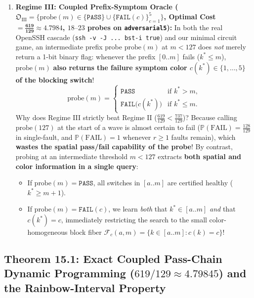 \documentclass[11pt,a4paper]{article}
\theoremstyle{definition}
\theoremstyle{remark}
\begin{document}
\begin{enumerate}[leftmargin=1.6em]
    \item \textbf{Regime III: Coupled Prefix-Symptom Oracle ($\mathfrak{O}_{\text{III}} = \{\text{probe}(m) \in \{\texttt{PASS}\} \cup \{\texttt{FAIL}(c)\}_{c=1}^5\}$, Optimal Cost $= \mathbf{\frac{619}{129} \approx 4.7984}$, $18\text{--}23$ probes on \texttt{adversarial5}):}
    In both the real OpenSSH cascade (\texttt{ssh -v -J ... bst-i true}) and our minimal circuit game, an intermediate prefix probe $\text{probe}(m)$ at $m < 127$ does \emph{not} merely return a 1-bit binary flag: whenever the prefix $[0..m]$ fails ($k^* \le m$), $\text{probe}(m)$ \textbf{also returns the failure symptom color $c(k^*) \in \{1,\dots,5\}$ of the blocking switch}!
    \begin{equation}
        \text{probe}(m) = \begin{cases}
            \texttt{PASS} & \text{if } k^* > m, \\
            \texttt{FAIL}\big(c(k^*)\big) & \text{if } k^* \le m.
        \end{cases}
    \end{equation}
    Why does Regime III strictly beat Regime II ($\frac{619}{129} < \frac{737}{129}$)? Because calling $\text{probe}(127)$ at the start of a wave is almost certain to fail ($\mathbb{P}(\text{FAIL}) = \frac{128}{129}$ in single-fault, and $\mathbb{P}(\text{FAIL}) = 1$ whenever $r \ge 1$ faults remain), which \textbf{wastes the spatial pass/fail capability of the probe}! By contrast, probing at an intermediate threshold $m < 127$ extracts \textbf{both spatial and color information in a single query}:
    \begin{itemize}
        \item If $\text{probe}(m) = \texttt{PASS}$, all switches in $[a..m]$ are certified healthy ($k^* \ge m+1$).
        \item If $\text{probe}(m) = \texttt{FAIL}(c)$, we learn \emph{both} that $k^* \in [a..m]$ \emph{and} that $c(k^*) = c$, immediately restricting the search to the small color-homogeneous block fiber $\mathcal{F}_c(a, m) = \{k \in [a..m] : c(k) = c\}$!
    \end{itemize}
\end{enumerate}

\subsection{Theorem 15.1: Exact Coupled Pass-Chain Dynamic Programming ($619/129 \approx 4.79845$) and the Rainbow-Interval Property}
\end{document}
